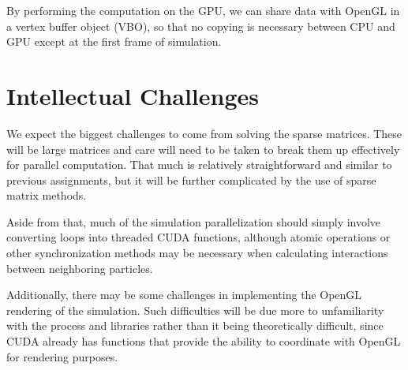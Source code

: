 \documentclass[cameraready]{acmsiggraph-awb}
\begin{document}
By performing the computation on the GPU, we can share data with OpenGL in a vertex buffer object (VBO), so that no copying is necessary between CPU and GPU except at the first frame of simulation.  


\section{Intellectual Challenges}

We expect the biggest challenges to come from solving the sparse matrices.
These will be large matrices and care will need to be taken to break them up effectively for parallel computation.
That much is relatively straightforward and similar to previous assignments, but it will be further complicated by the use of sparse matrix methods.

Aside from that, much of the simulation parallelization should simply involve converting loops into threaded CUDA functions, 
although atomic operations or other synchronization methods may be necessary when calculating interactions between neighboring particles.

Additionally, there may be some challenges in implementing the OpenGL rendering of the simulation.  
Such difficulties will be due more to unfamiliarity with the process and libraries rather than it being theoretically difficult, 
since CUDA already has functions that provide the ability to coordinate with OpenGL for rendering purposes.













\end{document}
